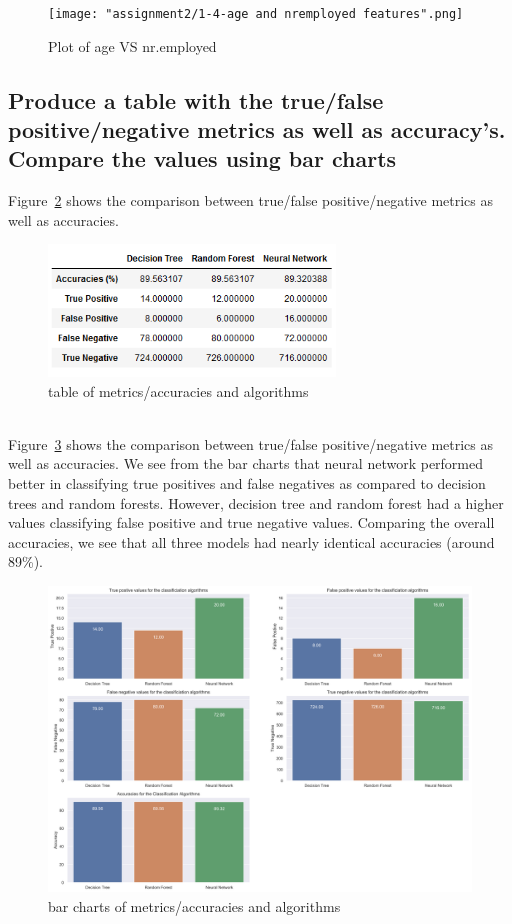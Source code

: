 \clearpage{}
\begin{figure}[!ht]
 \centering
\texttt{[image: "assignment2/1-4-age and nremployed features".png]}
\caption{\label{fig:2dplot3}Plot of age VS nr.employed }
\end{figure}
\clearpage{}

\newpage
\newpage
\newpage
\subsection{Produce a table with the true/false positive/negative metrics as well as accuracy's. Compare the values using bar charts}

Figure~\ref{fig:fig4} shows the comparison between true/false positive/negative metrics as well as accuracies. 
\begin{figure}[!ht]
 \centering
\includegraphics[width=3.0in]{assignment2/1-5_table.png}
\caption{\label{fig:fig4}table of metrics/accuracies and algorithms}
\end{figure}
\\
Figure~\ref{fig:fig5} shows the comparison between true/false positive/negative metrics as well as accuracies. We see from the bar charts that neural network performed better in classifying true positives and false negatives as compared to decision trees and random forests. However, decision tree and random forest had a higher values classifying false positive and true negative values. Comparing the overall accuracies, we see that all three models had nearly identical accuracies (around 89\%).
\begin{figure}[!ht]
 \centering
\includegraphics[width=5.1in]{assignment2/barcharts_algorithms.png}
\caption{\label{fig:fig5}bar charts of metrics/accuracies and algorithms}
\end{figure}

